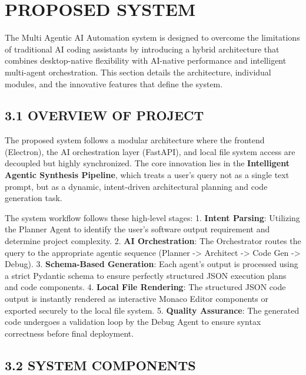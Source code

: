 \documentclass[
  12pt,
]{article}
\begin{document}
\newpage

\section{PROPOSED SYSTEM}\label{proposed-system}

The Multi Agentic AI Automation system is designed to overcome the
limitations of traditional AI coding assistants by introducing a hybrid
architecture that combines desktop-native flexibility with AI-native
performance and intelligent multi-agent orchestration. This section
details the architecture, individual modules, and the innovative
features that define the system.

\subsection{3.1 OVERVIEW OF PROJECT}\label{overview-of-project}

The proposed system follows a modular architecture where the frontend
(Electron), the AI orchestration layer (FastAPI), and local file system
access are decoupled but highly synchronized. The core innovation lies
in the \textbf{Intelligent Agentic Synthesis Pipeline}, which treats a
user's query not as a single text prompt, but as a dynamic,
intent-driven architectural planning and code generation task.

The system workflow follows these high-level stages: 1. \textbf{Intent
Parsing}: Utilizing the Planner Agent to identify the user's software
output requirement and determine project complexity. 2. \textbf{AI
Orchestration}: The Orchestrator routes the query to the appropriate
agentic sequence (Planner -\textgreater{} Architect -\textgreater{} Code
Gen -\textgreater{} Debug). 3. \textbf{Schema-Based Generation}: Each
agent's output is processed using a strict Pydantic schema to ensure
perfectly structured JSON execution plans and code components. 4.
\textbf{Local File Rendering}: The structured JSON code output is
instantly rendered as interactive Monaco Editor components or exported
securely to the local file system. 5. \textbf{Quality Assurance}: The
generated code undergoes a validation loop by the Debug Agent to ensure
syntax correctness before final deployment.

\subsection{3.2 SYSTEM COMPONENTS}\label{system-components}
\end{document}
